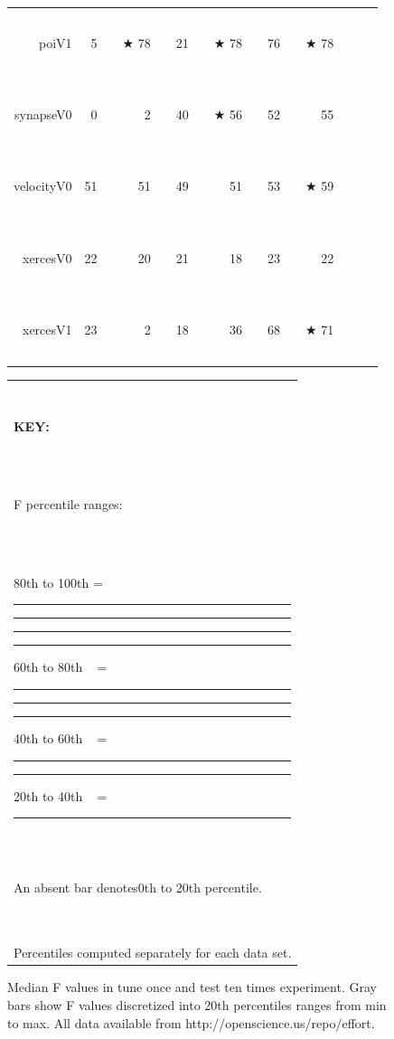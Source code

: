 \documentclass{sig-alternative}
\newcommand{\crule}[3][darkgray]{\textcolor{#1}{\rule{#2}{#3}}}
\newcommand{\rone}{\crule{1mm}{1.95mm}}
\newcommand{\rtwo}{\crule{1mm}{1.95mm}\hspace{0.3pt}\crule{1mm}{1.95mm}}
\newcommand{\rthree}{\crule{1mm}{1.95mm}\hspace{0.3pt}\crule{1mm}{1.95mm}\hspace{0.3pt}\crule{1mm}{1.95mm}}
\newcommand{\rfour}{\crule{1mm}{1.95mm}\hspace{0.3pt}\crule{1mm}{1.95mm}\hspace{0.3pt}\crule{1mm}{1.95mm}\hspace{0.3pt}\crule{1mm}{1.95mm}}
\begin{document}
\begin{figure}
\begin{minipage}{0.81\linewidth}
\begin{tabular}{r@{~}|r@{~}l@{~}|r@{~}l@{~}|r@{~}l|r@{~}@{~}l|r@{~}l@{~}|r@{~}l@{~}|r@{~}l}
poiV1 & 5 &         &$\bigstar$ 78 & {\rfour} & 21 & {\rone} &$\bigstar$ 78 & {\rfour} & 76 & {\rfour} &$\bigstar$ 78 & {\rfour}\\
synapseV0 & 0 &         & 2 &         & 40 & {\rthree} &$\bigstar$ 56 & {\rfour} & 52 & {\rfour} & 55 & {\rfour}\\
velocityV0 & 51 &         & 51 &         & 49 &         & 51 &         & 53 & {\rone} &$\bigstar$ 59 & {\rfour}\\
xercesV0 & 22 & {\rthree} & 20 & {\rone} & 21 & {\rtwo} & 18 &         & 23 & {\rfour} & 22 & {\rthree}\\
xercesV1 & 23 & {\rone} & 2 &         & 18 & {\rone} & 36 & {\rtwo} & 68 & {\rfour} &$\bigstar$ 71 & {\rfour}\\
\end{tabular}
\end{minipage}\begin{minipage}{.15\linewidth}
\begin{tabular}{|p{\linewidth}|}\hline

~\\

{\bf KEY:}

~\\

F percentile ranges:

~\\

80th to 100th = {\rfour}

60th to 80th ~ = {\rthree}

40th to 60th  ~ = {\rtwo}

20th to 40th  ~ = {\rone}

~\\

An absent bar denotes\newline 0th to 20th percentile.

~\\

Percentiles computed  separately
for each data set.\\\hline
\end{tabular}
\end{minipage}
\caption{Median F values in tune once and test ten times experiment. 
Gray bars  show  F values
discretized into 20th percentiles ranges from min to max.
All data available from http://openscience.us/repo/effort.
}\label{fig:nonc}
\end{figure}

\end{document}
